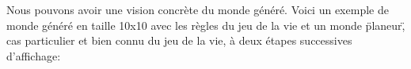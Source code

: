 \documentclass[11pt, a4paper]{article}
\begin{document}
Nous pouvons avoir une vision concrète du monde généré. Voici un exemple de monde généré en taille 10x10 avec les règles du jeu de la vie et un monde \"planeur\", cas particulier et bien connu du jeu de la vie, à deux étapes successives d'affichage:

\begin{figure}[!h]
    \hfill
\end{figure}
\end{document}
